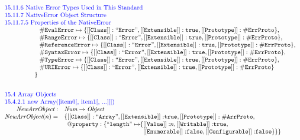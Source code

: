 \documentclass[a4paper, leqno]{amsart}
\def\inblue{\color{blue}}
\newcommand{\false}{{\tt false}}
\newcommand{\true}{{\tt true}}
\newcommand{\Obj}{\emph{Object}}
\newcommand{\Num}{\emph{Num}}
\newcommand{\hf}[1]{\emph{#1}}
\def\inblue{\color{blue}}
\begin{document}
\[\begin{array}{rl}
\multicolumn{2}{l}{\mbox{\inblue 15.11.6 Native Error Types Used in This Standard}}\\
\multicolumn{2}{l}{\mbox{\inblue 15.11.7 NativeError Object Structure}}\\
\multicolumn{2}{l}{\mbox{\inblue 15.11.7.5 Properties of the NativeError}}\\
\multicolumn{2}{l}{\phantom{\emph{InitHeap} = \{}
{\tt\#EvalError} \mapsto \{{\tt [[Class]]: ``Error"}, {\tt [[Extensible]]: \true}, {\tt [[Prototype]]: \#ErrProto}
\},}\\%
\multicolumn{2}{l}{\phantom{\emph{InitHeap} = \{}
{\tt\#RangeError} \mapsto \{{\tt [[Class]]: ``Error"}, {\tt [[Extensible]]: \true}, {\tt [[Prototype]]: \#ErrProto}
\},}\\%
\multicolumn{2}{l}{\phantom{\emph{InitHeap} = \{}
{\tt\#ReferenceError} \mapsto \{{\tt [[Class]]: ``Error"}, {\tt [[Extensible]]: \true}, {\tt [[Prototype]]: \#ErrProto}
\},}\\%
\multicolumn{2}{l}{\phantom{\emph{InitHeap} = \{}
{\tt\#SyntaxError} \mapsto \{{\tt [[Class]]: ``Error"}, {\tt [[Extensible]]: \true}, {\tt [[Prototype]]: \#ErrProto}
\},}\\%
\multicolumn{2}{l}{\phantom{\emph{InitHeap} = \{}
{\tt\#TypeError} \mapsto \{{\tt [[Class]]: ``Error"}, {\tt [[Extensible]]: \true}, {\tt [[Prototype]]: \#ErrProto}
\},}\\%
\multicolumn{2}{l}{\phantom{\emph{InitHeap} = \{}
{\tt\#URIError} \mapsto \{{\tt [[Class]]: ``Error"}, {\tt [[Extensible]]: \true}, {\tt [[Prototype]]: \#ErrProto}
\}}\\%


\multicolumn{2}{l}{\phantom{\emph{InitHeap} = }
\}}
\\[2em]

\multicolumn{2}{l}{\mbox{\inblue 15.4 Array Objects}}\\
\multicolumn{2}{l}{\mbox{\inblue 15.4.2.1 new Array([item0[, item1[, ...]]])}}\\
\hf{NewArrObject} : & \Num \rightarrow \Obj\\
\hf{NewArrObject}(n)=&
 {\tt \{[[Class]]: ``Array"}, {\tt [[Extensible]]:} \true,%
{\tt [[Prototype]]: \#ArrProto},\\
& \phantom{\{}{\tt @property: \{``length"\mapsto}\{{\tt [[Value]]:}n,
 {\tt [[Writable]]:} \true,\\%
& \phantom{\{{\tt @property: \{``length"\mapsto}\{}%
 {\tt [[Enumerable]]:} \false,
 {\tt [[Configurable]]:} \false\}\}\}
\\[1em]



\end{array}\]
\end{document}
